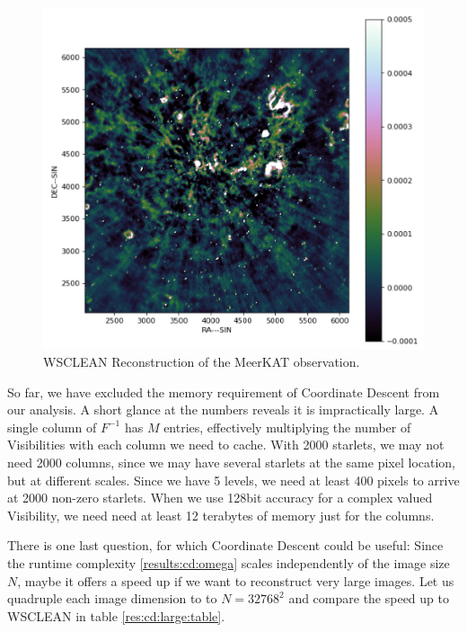 \begin{figure}[h]
	\centering
	\includegraphics[width=0.6\linewidth]{./chapters/20.results/meerkat.png}
	\caption{WSCLEAN Reconstruction of the MeerKAT observation.}
	\label{scale:wsclean}
\end{figure}

So far, we have excluded the memory requirement of Coordinate Descent from our analysis. A short glance at the numbers reveals it is impractically large. A single column of $F^{-1}$ has $M$ entries, effectively multiplying the number of Visibilities with each column we need to cache. With 2000 starlets, we may not need 2000 columns, since we may have several starlets at the same pixel location, but at different scales. Since we have 5 levels, we need at least 400 pixels to arrive at 2000 non-zero starlets. When we use 128bit accuracy for a complex valued Visibility, we need need at least 12 terabytes of memory just for the columns.

There is one last question, for which Coordinate Descent could be useful: Since the runtime complexity \eqref{results:cd:omega} scales independently of the image size $N$, maybe it offers a speed up if we want to reconstruct very large images. Let us quadruple each image dimension to  to $N=32768^2$ and compare the speed up to WSCLEAN in table \ref{res:cd:large:table}. 

